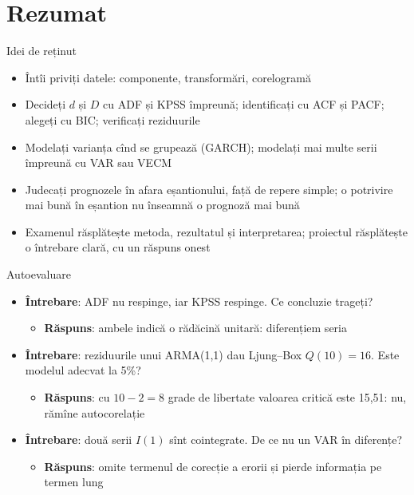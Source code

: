 \section{Rezumat}

\begin{frame}{Idei de reținut}
\itemsize{\small}
\begin{itemize}
    \item Întîi priviți datele: componente, transformări, corelogramă
    \item Decideți $d$ și $D$ cu ADF și KPSS împreună; identificați cu ACF și PACF; alegeți cu BIC; verificați reziduurile
    \item Modelați varianța cînd se grupează (GARCH); modelați mai multe serii împreună cu VAR sau VECM
    \item Judecați prognozele în afara eșantionului, față de repere simple; o potrivire mai bună în eșantion nu înseamnă o prognoză mai bună
    \item Examenul răsplătește metoda, rezultatul și interpretarea; proiectul răsplătește o întrebare clară, cu un răspuns onest
\end{itemize}
\end{frame}

\begin{frame}{Autoevaluare}
\itemsize{\small}
\begin{itemize}
    \item \textbf{Întrebare}: ADF nu respinge, iar KPSS respinge. Ce concluzie trageți?
    \begin{itemize}
        \item \textbf{Răspuns}: ambele indică o rădăcină unitară: diferențiem seria
    \end{itemize}
    \item \textbf{Întrebare}: reziduurile unui ARMA(1,1) dau Ljung--Box $Q(10) = 16$. Este modelul adecvat la 5\%?
    \begin{itemize}
        \item \textbf{Răspuns}: cu $10 - 2 = 8$ grade de libertate valoarea critică este 15,51: nu, rămîne autocorelație
    \end{itemize}
    \item \textbf{Întrebare}: două serii $I(1)$ sînt cointegrate. De ce nu un VAR în diferențe?
    \begin{itemize}
        \item \textbf{Răspuns}: omite termenul de corecție a erorii și pierde informația pe termen lung
    \end{itemize}
\end{itemize}
\end{frame}


